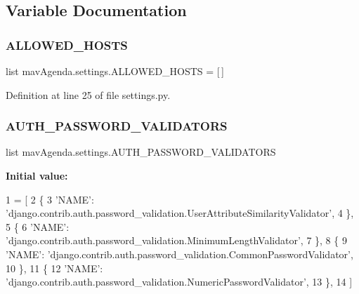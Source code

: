 \subsection{Variable Documentation}
\mbox{\label{namespacemavAgenda_1_1settings_a4610b713f82b38669b6a415cb65fcf99}} 
\subsubsection{\texorpdfstring{A\+L\+L\+O\+W\+E\+D\+\_\+\+H\+O\+S\+TS}{ALLOWED\_HOSTS}}
{\footnotesize\ttfamily list mav\+Agenda.\+settings.\+A\+L\+L\+O\+W\+E\+D\+\_\+\+H\+O\+S\+TS = \mbox{[}$\,$\mbox{]}}



Definition at line 25 of file settings.\+py.

\mbox{\label{namespacemavAgenda_1_1settings_a168b84f6e963453be6cd21c6135b5d28}} 
\subsubsection{\texorpdfstring{A\+U\+T\+H\+\_\+\+P\+A\+S\+S\+W\+O\+R\+D\+\_\+\+V\+A\+L\+I\+D\+A\+T\+O\+RS}{AUTH\_PASSWORD\_VALIDATORS}}
{\footnotesize\ttfamily list mav\+Agenda.\+settings.\+A\+U\+T\+H\+\_\+\+P\+A\+S\+S\+W\+O\+R\+D\+\_\+\+V\+A\+L\+I\+D\+A\+T\+O\+RS}

{\bfseries Initial value\+:}
\begin{DoxyCode}
1 =  [
2     \{
3         \textcolor{stringliteral}{'NAME'}: \textcolor{stringliteral}{'django.contrib.auth.password\_validation.UserAttributeSimilarityValidator'},
4     \},
5     \{
6         \textcolor{stringliteral}{'NAME'}: \textcolor{stringliteral}{'django.contrib.auth.password\_validation.MinimumLengthValidator'},
7     \},
8     \{
9         \textcolor{stringliteral}{'NAME'}: \textcolor{stringliteral}{'django.contrib.auth.password\_validation.CommonPasswordValidator'},
10     \},
11     \{
12         \textcolor{stringliteral}{'NAME'}: \textcolor{stringliteral}{'django.contrib.auth.password\_validation.NumericPasswordValidator'},
13     \},
14 ]
\end{DoxyCode}


